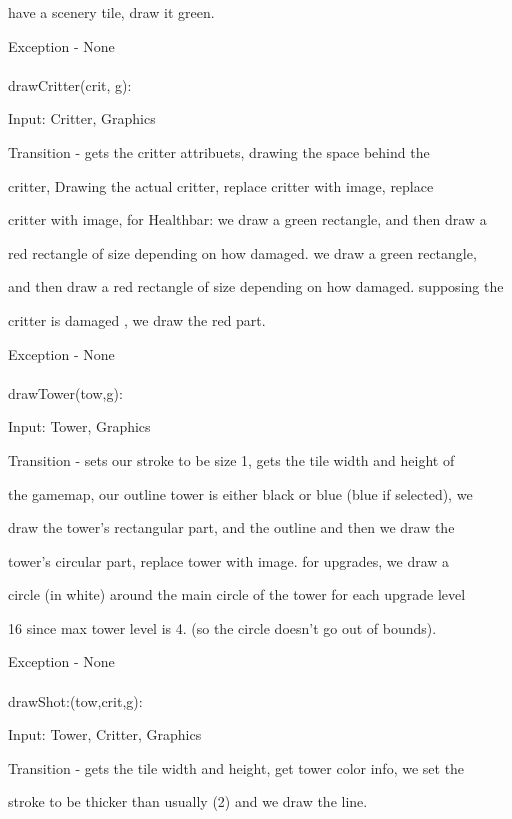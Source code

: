 \documentclass[12,english]{article}
\begin{document}
		    have a scenery tile, draw it green.
		    
		    Exception - None\\ 
			 \\
		drawCritter(crit, g):
		    
		    Input: Critter, Graphics
		       
		    Transition - gets the critter attribuets, drawing the space behind the
		    
		    critter, Drawing the actual critter, replace critter with image, replace
		    
		    critter with image, for Healthbar: we draw a green rectangle, and then draw a
		    
		    red rectangle of size depending on how damaged. we draw a green rectangle,
		    
		    and then draw a red rectangle of size depending on how damaged. supposing the
		    
		    critter is damaged , we draw the red part.
		    
		    Exception - None\\ 
			 \\
		drawTower(tow,g):
		    
		    Input: Tower, Graphics
		    
		    Transition - sets our stroke to be size 1, gets the tile width and height of
		    
		    the gamemap, our outline tower is either black or blue (blue if selected), we
		    
		    draw the tower's rectangular part, and the outline and then we draw the
		    
		    tower's circular part, replace tower with image. for upgrades, we draw a
		    
		    circle (in white) around the main circle of the tower for each upgrade level
		    
		    16 since max tower level is 4. (so the circle doesn't go out of bounds).
		    
		    Exception - None\\ 
			 \\
		drawShot:(tow,crit,g):
		    
		    Input: Tower, Critter, Graphics
		    
		    Transition - gets the tile width and height, get tower color info, we set the
		    
		    stroke to be thicker than usually (2) and we draw the line.
		    
\end{document}
